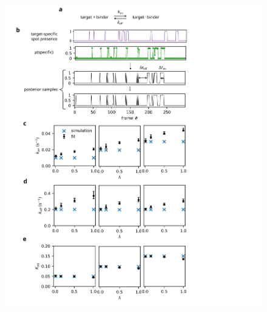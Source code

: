 \begin{figure}[t]
\centering
\includegraphics[width=130mm]{figures/figure6/figure6.png}

\end{figure}
